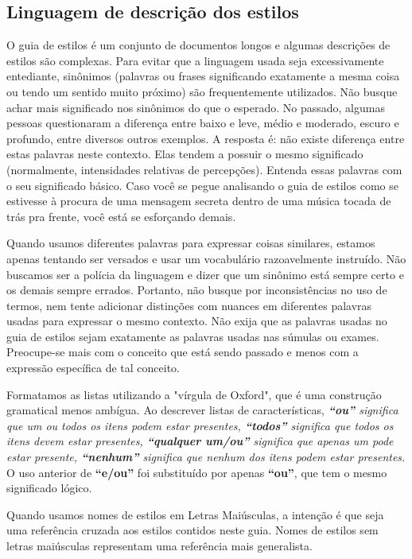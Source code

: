 \subsection*{Linguagem de descrição dos estilos}
O guia de estilos é um conjunto de documentos longos e algumas descrições de estilos são complexas. Para evitar que a linguagem usada seja excessivamente entediante, sinônimos (palavras ou frases significando exatamente a mesma coisa ou tendo um sentido muito próximo) são frequentemente utilizados. Não busque achar mais significado nos sinônimos do que o esperado. No passado, algumas pessoas questionaram a diferença entre baixo e leve, médio e moderado, escuro e profundo, entre diversos outros exemplos. A resposta é: não existe diferença entre estas palavras neste contexto. Elas tendem a possuir o mesmo significado (normalmente, intensidades relativas de percepções). Entenda essas palavras com o seu significado básico. Caso você se pegue analisando o guia de estilos como se estivesse à procura de uma mensagem secreta dentro de uma música tocada de trás pra frente, você está se esforçando demais.

Quando usamos diferentes palavras para expressar coisas similares, estamos apenas tentando ser versados e usar um vocabulário razoavelmente instruído. Não buscamos ser a polícia da linguagem e dizer que um sinônimo está sempre certo e os demais sempre errados. Portanto, não busque por inconsistências no uso de termos, nem tente adicionar distinções com nuances em diferentes palavras usadas para expressar o mesmo contexto. Não exija que as palavras usadas no guia de estilos sejam exatamente as palavras usadas nas súmulas ou exames. Preocupe-se mais com o conceito que está sendo passado e menos com a expressão específica de tal conceito.

Formatamos as listas utilizando a "vírgula de Oxford", que é uma construção gramatical menos ambígua. Ao descrever listas de características, \textit{\textbf{“ou”} significa que um ou todos os itens podem estar presentes, \textbf{“todos”} significa que todos os itens devem estar presentes, \textbf{“qualquer um/ou”} significa que apenas um pode estar presente, \textbf{“nenhum”} significa que nenhum dos itens podem estar presentes.} O uso anterior de \textbf{“e/ou”} foi substituído por apenas \textbf{“ou”}, que tem o mesmo significado lógico.

Quando usamos nomes de estilos em Letras Maiúsculas, a intenção é que seja uma referência cruzada aos estilos contidos neste guia. Nomes de estilos sem letras maiúsculas representam uma referência mais generalista.

